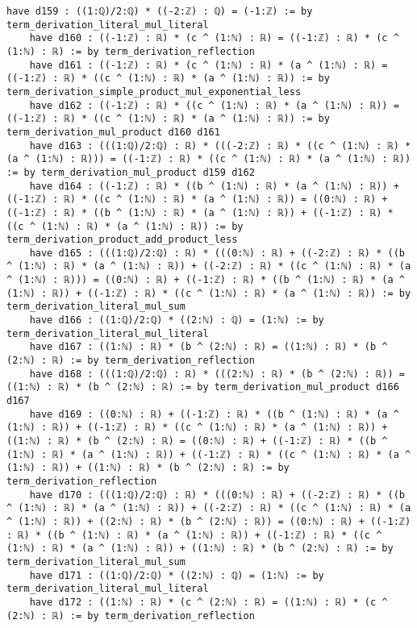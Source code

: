 \documentclass{article}
\begin{document}
\begin{tcolorbox}[colback=white!10, width=\linewidth]
\begin{lstlisting}[language=Lean4]
    have d159 : ((1:ℚ)/2:ℚ) * ((-2:ℤ) : ℚ) = (-1:ℤ) := by term_derivation_literal_mul_literal
    have d160 : ((-1:ℤ) : ℝ) * (c ^ (1:ℕ) : ℝ) = ((-1:ℤ) : ℝ) * (c ^ (1:ℕ) : ℝ) := by term_derivation_reflection
    have d161 : ((-1:ℤ) : ℝ) * (c ^ (1:ℕ) : ℝ) * (a ^ (1:ℕ) : ℝ) = ((-1:ℤ) : ℝ) * ((c ^ (1:ℕ) : ℝ) * (a ^ (1:ℕ) : ℝ)) := by term_derivation_simple_product_mul_exponential_less
    have d162 : ((-1:ℤ) : ℝ) * ((c ^ (1:ℕ) : ℝ) * (a ^ (1:ℕ) : ℝ)) = ((-1:ℤ) : ℝ) * ((c ^ (1:ℕ) : ℝ) * (a ^ (1:ℕ) : ℝ)) := by term_derivation_mul_product d160 d161
    have d163 : (((1:ℚ)/2:ℚ) : ℝ) * (((-2:ℤ) : ℝ) * ((c ^ (1:ℕ) : ℝ) * (a ^ (1:ℕ) : ℝ))) = ((-1:ℤ) : ℝ) * ((c ^ (1:ℕ) : ℝ) * (a ^ (1:ℕ) : ℝ)) := by term_derivation_mul_product d159 d162
    have d164 : ((-1:ℤ) : ℝ) * ((b ^ (1:ℕ) : ℝ) * (a ^ (1:ℕ) : ℝ)) + ((-1:ℤ) : ℝ) * ((c ^ (1:ℕ) : ℝ) * (a ^ (1:ℕ) : ℝ)) = ((0:ℕ) : ℝ) + ((-1:ℤ) : ℝ) * ((b ^ (1:ℕ) : ℝ) * (a ^ (1:ℕ) : ℝ)) + ((-1:ℤ) : ℝ) * ((c ^ (1:ℕ) : ℝ) * (a ^ (1:ℕ) : ℝ)) := by term_derivation_product_add_product_less
    have d165 : (((1:ℚ)/2:ℚ) : ℝ) * (((0:ℕ) : ℝ) + ((-2:ℤ) : ℝ) * ((b ^ (1:ℕ) : ℝ) * (a ^ (1:ℕ) : ℝ)) + ((-2:ℤ) : ℝ) * ((c ^ (1:ℕ) : ℝ) * (a ^ (1:ℕ) : ℝ))) = ((0:ℕ) : ℝ) + ((-1:ℤ) : ℝ) * ((b ^ (1:ℕ) : ℝ) * (a ^ (1:ℕ) : ℝ)) + ((-1:ℤ) : ℝ) * ((c ^ (1:ℕ) : ℝ) * (a ^ (1:ℕ) : ℝ)) := by term_derivation_literal_mul_sum
    have d166 : ((1:ℚ)/2:ℚ) * ((2:ℕ) : ℚ) = (1:ℕ) := by term_derivation_literal_mul_literal
    have d167 : ((1:ℕ) : ℝ) * (b ^ (2:ℕ) : ℝ) = ((1:ℕ) : ℝ) * (b ^ (2:ℕ) : ℝ) := by term_derivation_reflection
    have d168 : (((1:ℚ)/2:ℚ) : ℝ) * (((2:ℕ) : ℝ) * (b ^ (2:ℕ) : ℝ)) = ((1:ℕ) : ℝ) * (b ^ (2:ℕ) : ℝ) := by term_derivation_mul_product d166 d167
    have d169 : ((0:ℕ) : ℝ) + ((-1:ℤ) : ℝ) * ((b ^ (1:ℕ) : ℝ) * (a ^ (1:ℕ) : ℝ)) + ((-1:ℤ) : ℝ) * ((c ^ (1:ℕ) : ℝ) * (a ^ (1:ℕ) : ℝ)) + ((1:ℕ) : ℝ) * (b ^ (2:ℕ) : ℝ) = ((0:ℕ) : ℝ) + ((-1:ℤ) : ℝ) * ((b ^ (1:ℕ) : ℝ) * (a ^ (1:ℕ) : ℝ)) + ((-1:ℤ) : ℝ) * ((c ^ (1:ℕ) : ℝ) * (a ^ (1:ℕ) : ℝ)) + ((1:ℕ) : ℝ) * (b ^ (2:ℕ) : ℝ) := by term_derivation_reflection
    have d170 : (((1:ℚ)/2:ℚ) : ℝ) * (((0:ℕ) : ℝ) + ((-2:ℤ) : ℝ) * ((b ^ (1:ℕ) : ℝ) * (a ^ (1:ℕ) : ℝ)) + ((-2:ℤ) : ℝ) * ((c ^ (1:ℕ) : ℝ) * (a ^ (1:ℕ) : ℝ)) + ((2:ℕ) : ℝ) * (b ^ (2:ℕ) : ℝ)) = ((0:ℕ) : ℝ) + ((-1:ℤ) : ℝ) * ((b ^ (1:ℕ) : ℝ) * (a ^ (1:ℕ) : ℝ)) + ((-1:ℤ) : ℝ) * ((c ^ (1:ℕ) : ℝ) * (a ^ (1:ℕ) : ℝ)) + ((1:ℕ) : ℝ) * (b ^ (2:ℕ) : ℝ) := by term_derivation_literal_mul_sum
    have d171 : ((1:ℚ)/2:ℚ) * ((2:ℕ) : ℚ) = (1:ℕ) := by term_derivation_literal_mul_literal
    have d172 : ((1:ℕ) : ℝ) * (c ^ (2:ℕ) : ℝ) = ((1:ℕ) : ℝ) * (c ^ (2:ℕ) : ℝ) := by term_derivation_reflection

\end{lstlisting}
\end{tcolorbox}
\end{document}
